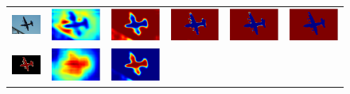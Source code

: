 \begin{figure}[ht]
  \centering
  \begin{tabular}{c c c c c c}
    \includegraphics[width=0.13\linewidth]{fig/mean_field_illustration/2007_007470.jpg} & 
    \includegraphics[width=0.13\linewidth]{fig/mean_field_illustration/Score_Class0_Itr0.pdf} &
    \includegraphics[width=0.13\linewidth]{fig/mean_field_illustration/Belief_Class0_Itr0.pdf} & 
    \includegraphics[width=0.13\linewidth]{fig/mean_field_illustration/Belief_Class0_Itr1.pdf} & 
    \includegraphics[width=0.13\linewidth]{fig/mean_field_illustration/Belief_Class0_Itr2.pdf} & 
    \includegraphics[width=0.13\linewidth]{fig/mean_field_illustration/Belief_Class0_Itr10.pdf}\\
    \includegraphics[width=0.13\linewidth]{fig/mean_field_illustration/2007_007470.png} & 
    \includegraphics[width=0.13\linewidth]{fig/mean_field_illustration/Score_Class1_Itr0.pdf} & 
    \includegraphics[width=0.13\linewidth]{fig/mean_field_illustration/Belief_Class1_Itr0.pdf} & 

\end{tabular}
\end{figure}
